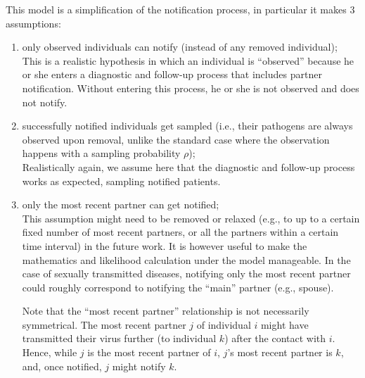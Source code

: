 \documentclass[10pt,letterpaper]{article}
\begin{document}
This model is a simplification of the notification process, in particular it makes 3 assumptions:
\begin{enumerate}
\item only observed individuals can notify (instead of any removed individual);\\

This is a realistic hypothesis in which an individual is ``observed'' because he or she enters a diagnostic and follow-up process that includes partner notification. Without entering this process, he or she is not observed and does not notify.

\item successfully notified individuals get sampled (i.e., their pathogens are always observed upon removal, unlike the standard case where the observation happens with a sampling probability $\rho$);\\

Realistically again, we assume here that the diagnostic and follow-up process works as expected, sampling notified patients.

%

\item only the most recent partner can get notified;\\

This assumption might need to be removed or relaxed (e.g., to up to a certain fixed number of most recent partners, or all the partners within a certain time interval) in the future work. It is however useful to make the mathematics and likelihood calculation under the model manageable. In the case of sexually transmitted diseases, notifying only the most recent partner could roughly correspond to notifying the ``main'' partner (e.g., spouse).

Note that the ``most recent partner'' relationship is not necessarily symmetrical. The most recent partner $j$ of individual $i$ might have transmitted their virus further (to individual $k$) after the contact with $i$. Hence, while $j$ is the most recent partner of $i$, $j$'s most recent partner is $k$, and, once notified, $j$ might notify $k$.  
\end{enumerate}
\end{document}
